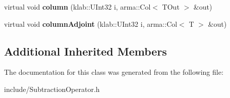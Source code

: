\begin{DoxyCompactItemize}
\item 
virtual void {\bfseries column} (klab\+::\+U\+Int32 i, arma\+::\+Col$<$ T\+Out $>$ \&out)\hypertarget{classkl1p_1_1TSubtractionOperator_a2799e4d75732f8cfbcfe08df410e1801}{}\label{classkl1p_1_1TSubtractionOperator_a2799e4d75732f8cfbcfe08df410e1801}

\item 
virtual void {\bfseries column\+Adjoint} (klab\+::\+U\+Int32 i, arma\+::\+Col$<$ T $>$ \&out)\hypertarget{classkl1p_1_1TSubtractionOperator_ac271162d9a6c27f259f8c430c222e398}{}\label{classkl1p_1_1TSubtractionOperator_ac271162d9a6c27f259f8c430c222e398}

\end{DoxyCompactItemize}
\subsection*{Additional Inherited Members}


The documentation for this class was generated from the following file\+:\begin{DoxyCompactItemize}
\item 
include/Subtraction\+Operator.\+h\end{DoxyCompactItemize}
